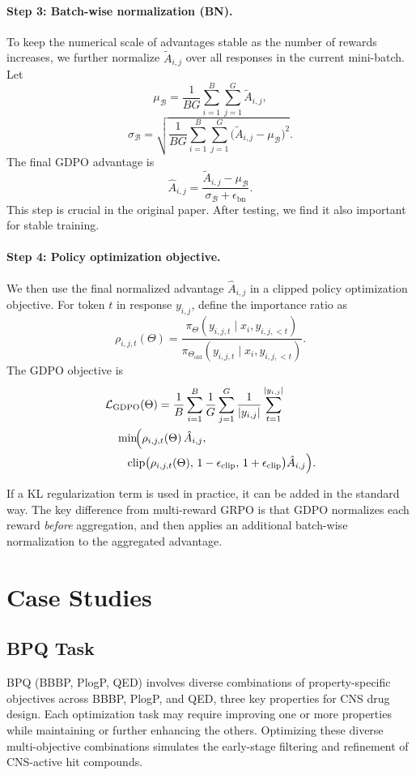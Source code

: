 \documentclass[11pt]{article}
\begin{document}
\paragraph{Step 3: Batch-wise normalization (BN).}
To keep the numerical scale of advantages stable as the number of rewards increases,
we further normalize $\tilde{A}_{i,j}$ over all responses in the current mini-batch.
Let
\[
\mu_{\mathcal{B}} =
\frac{1}{BG} \sum_{i=1}^{B} \sum_{j=1}^{G} \tilde{A}_{i,j},
\]
\[
\sigma_{\mathcal{B}} =
\sqrt{
\frac{1}{BG} \sum_{i=1}^{B} \sum_{j=1}^{G}
\bigl(\tilde{A}_{i,j} - \mu_{\mathcal{B}}\bigr)^2
}.
\]
The final GDPO advantage is
\[
\hat{A}_{i,j} =
\frac{\tilde{A}_{i,j} - \mu_{\mathcal{B}}}{\sigma_{\mathcal{B}} + \epsilon_{\mathrm{bn}}}.
\]
This step is crucial in the original paper. After testing, we find it also important for stable training.

\paragraph{Step 4: Policy optimization objective.}
We then use the final normalized advantage $\hat{A}_{i,j}$ in a clipped policy
optimization objective.
For token $t$ in response $y_{i,j}$, define the importance ratio as
\[
\rho_{i,j,t}(\Theta)
=
\frac{
\pi_{\Theta}(y_{i,j,t} \mid x_i, y_{i,j,<t})
}{
\pi_{\Theta_{\mathrm{old}}}(y_{i,j,t} \mid x_i, y_{i,j,<t})
}.
\]
The GDPO objective is
\[
\begin{aligned}
&\mathcal{L}_{\mathrm{GDPO}}(\Theta)
=
\frac{1}{B} \sum_{i=1}^{B}
\frac{1}{G} \sum_{j=1}^{G}
\frac{1}{|y_{i,j}|} \sum_{t=1}^{|y_{i,j}|} \\
&\quad\min\!\Bigl(
\rho_{i,j,t}(\Theta)\,\hat{A}_{i,j}, \\
&\qquad
\mathrm{clip}\bigl(
\rho_{i,j,t}(\Theta),\, 1-\epsilon_{\mathrm{clip}},\, 1+\epsilon_{\mathrm{clip}}
\bigr)\hat{A}_{i,j}
\Bigr).
\end{aligned}
\]

If a KL regularization term is used in practice, it can be added in the standard way.
The key difference from multi-reward GRPO is that GDPO normalizes each reward
\emph{before} aggregation, and then applies an additional batch-wise normalization
to the aggregated advantage.

\section{Case Studies}
\subsection{BPQ Task}
BPQ (BBBP, PlogP, QED) involves diverse combinations of property-specific objectives across BBBP, PlogP, and QED, three key properties for CNS drug design. Each optimization task may require improving one or more properties while maintaining or further enhancing the others. Optimizing these diverse multi-objective combinations simulates the early-stage filtering and refinement of CNS-active hit compounds.
\end{document}
